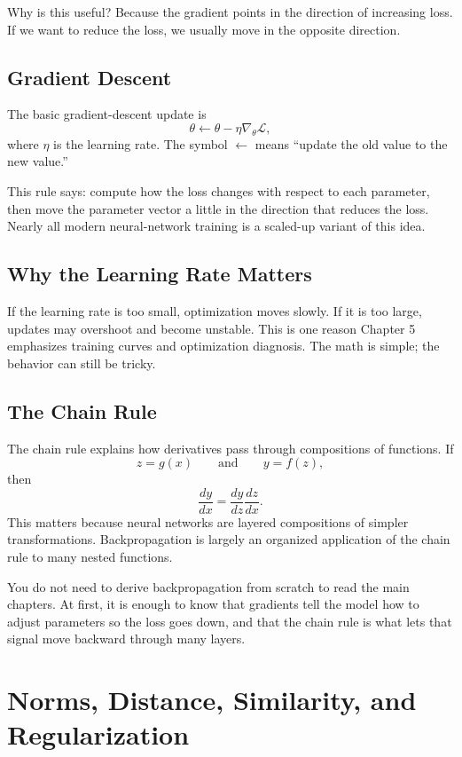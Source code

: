 Why is this useful? Because the gradient points in the direction of increasing loss. If we want to reduce the loss, we usually move in the opposite direction.

\subsection{Gradient Descent}

The basic gradient-descent update is
\[
\theta \leftarrow \theta - \eta \nabla_\theta \mathcal{L},
\]
where $\eta$ is the learning rate. The symbol $\leftarrow$ means ``update the old value to the new value.''

This rule says: compute how the loss changes with respect to each parameter, then move the parameter vector a little in the direction that reduces the loss. Nearly all modern neural-network training is a scaled-up variant of this idea.

\subsection{Why the Learning Rate Matters}

If the learning rate is too small, optimization moves slowly. If it is too large, updates may overshoot and become unstable. This is one reason Chapter 5 emphasizes training curves and optimization diagnosis. The math is simple; the behavior can still be tricky.

\subsection{The Chain Rule}

The chain rule explains how derivatives pass through compositions of functions. If
\[
z = g(x)
\qquad \text{and} \qquad
y = f(z),
\]
then
\[
\frac{dy}{dx} = \frac{dy}{dz}\frac{dz}{dx}.
\]
This matters because neural networks are layered compositions of simpler transformations. Backpropagation is largely an organized application of the chain rule to many nested functions.

\begin{prereqbridge}
You do not need to derive backpropagation from scratch to read the main chapters. At first, it is enough to know that gradients tell the model how to adjust parameters so the loss goes down, and that the chain rule is what lets that signal move backward through many layers.
\end{prereqbridge}

\section{Norms, Distance, Similarity, and Regularization}

